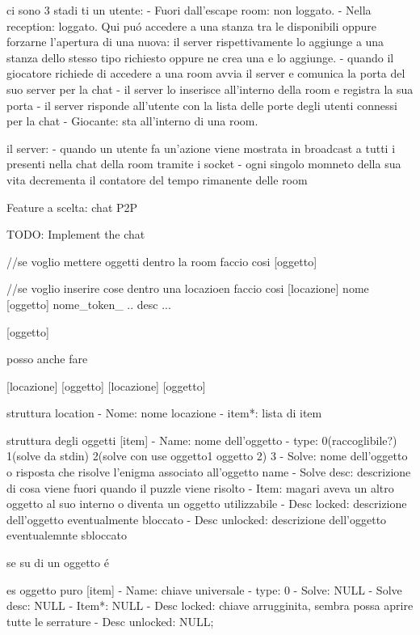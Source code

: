 ci sono 3 stadi ti un utente:
  - Fuori dall'escape room: non loggato.
  - Nella reception: loggato. Qui puó accedere a una stanza tra le disponibili oppure forzarne l'apertura di una nuova: il server rispettivamente 
  lo aggiunge a una stanza dello stesso tipo richiesto oppure ne crea una e lo aggiunge.
      - quando il giocatore richiede di accedere a una room avvia il server e comunica la porta del suo server per la chat
      - il server lo inserisce all'interno della room e registra la sua porta
      - il server risponde all'utente con la lista delle porte degli utenti connessi per la chat 
  - Giocante: sta all'interno di una room.

il server:
  - quando un utente fa un'azione viene mostrata in broadcast a tutti i presenti nella chat della room tramite
i socket
  - ogni singolo momneto della sua vita decrementa il contatore del tempo rimanente delle room 

Feature a scelta: chat P2P


TODO: Implement the chat

//se voglio mettere oggetti dentro la room faccio cosi
[oggetto]

//se voglio inserire cose dentro una locazioen faccio cosi
[locazione] nome
  [oggetto]
    nome_token_ .. desc ...
    
  [oggetto]

posso anche fare 

[locazione]
  [oggetto]
  [locazione]
    [oggetto]
    
struttura location
  - Nome: nome locazione
  - item*: lista di item
  


struttura degli oggetti
[item]
  - Name: nome dell'oggetto
  - type: 0(raccoglibile?) 1(solve da stdin) 2(solve con use oggetto1 oggetto 2) 3  
  - Solve: nome dell'oggetto o risposta che risolve l'enigma associato all'oggetto name
  - Solve desc: descrizione di cosa viene fuori quando il puzzle viene risolto
  - Item: magari aveva un altro oggetto al suo interno o diventa un oggetto utilizzabile
  - Desc locked: descrizione dell'oggetto eventualmente bloccato
  - Desc unlocked: descrizione dell'oggetto eventualemnte sbloccato

se su di un oggetto é 

es oggetto puro
[item]
  - Name: chiave universale
  - type: 0
  - Solve: NULL
  - Solve desc: NULL
  - Item*: NULL
  - Desc locked: chiave arrugginita, sembra possa aprire tutte le serrature
  - Desc unlocked: NULL;

